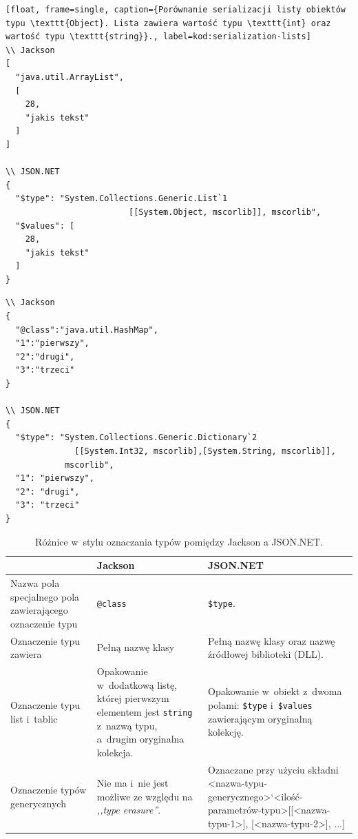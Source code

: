 \begin{lstlisting}[float, frame=single, caption={Porównanie serializacji listy obiektów typu \texttt{Object}. Lista zawiera wartość typu \texttt{int} oraz wartość typu \texttt{string}}., label=kod:serialization-lists]
\\ Jackson
[
  "java.util.ArrayList",
  [
    28,
    "jakis tekst"
  ]
]

\\ JSON.NET
{
  "$type": "System.Collections.Generic.List`1
	                     [[System.Object, mscorlib]], mscorlib",
  "$values": [
    28,
    "jakis tekst"
  ]
}
\end{lstlisting}

\begin{lstlisting}[float, frame=single, caption={Porównanie serializacji słownika/mapy (\emph{dictionary/map}) mapującego wartość typu \texttt{string} do wartości typu \texttt{int} (\texttt{int} jest kluczem).}, label=kod:serialization-dicts]
\\ Jackson
{
  "@class":"java.util.HashMap",
  "1":"pierwszy",
  "2":"drugi",
  "3":"trzeci"
}

\\ JSON.NET
{
  "$type": "System.Collections.Generic.Dictionary`2
	          [[System.Int32, mscorlib],[System.String, mscorlib]],
            mscorlib",
  "1": "pierwszy",
  "2": "drugi",
  "3": "trzeci"
}
\end{lstlisting}

\begin{table}[htbp]              
	\centering
	\caption{Różnice w~stylu oznaczania typów pomiędzy Jackson a JSON.NET.}
		\begin{tabular}{ | p{} || p{} | p{} | }
			\hline
				& \textbf{Jackson} & \textbf{JSON.NET} \\
				\hline \hline
				Nazwa pola specjalnego pola zawierającego oznaczenie typu & \texttt{@class} & \texttt{\$type}. \\
				\hline
				Oznaczenie typu zawiera & Pełną nazwę klasy & Pełną nazwę klasy oraz nazwę źródłowej biblioteki (DLL). \\
				\hline
				Oznaczenie typu list i~tablic & Opakowanie w~dodatkową listę, której pierwszym elementem jest \texttt{string} z~nazwą typu, a~drugim oryginalna kolekcja. & Opakowanie w~obiekt z~dwoma polami: \texttt{\$type} i~\texttt{\$values} zawierającym oryginalną kolekcję. \\
				\hline
				Oznaczenie typów generycznych & Nie ma i~nie jest możliwe ze względu na \emph{,,type erasure''}. & Oznaczane przy użyciu składni <nazwa-typu-generycznego>`<ilość-parametrów-typu>[[<nazwa-typu-1>], [<nazwa-typu-2>], ...] \\
				\hline
		\end{tabular}
	\label{tab:jackson-jsonnet-differences}
\end{table}

